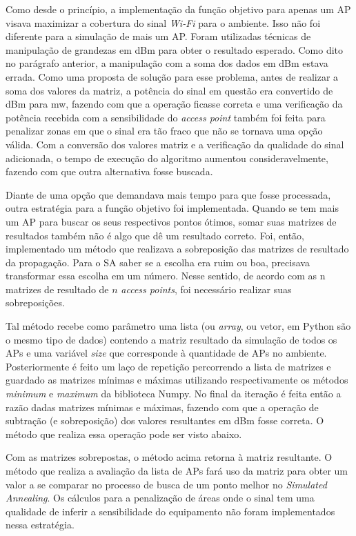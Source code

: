\documentclass[
	12pt,				%
	openright,			%
	twoside,			%
	a4paper,			%
	english,			%
	french,				%
	spanish,			%
	brazil				%
	]{abntex2}
\begin{document}
Como desde o princípio, a implementação da função objetivo para apenas um AP visava maximizar a cobertura do sinal \textit{Wi-Fi} para o ambiente. Isso não foi diferente para a simulação de mais um AP. Foram utilizadas técnicas de manipulação de grandezas em dBm para obter o resultado esperado. Como dito no parágrafo anterior, a manipulação com a soma dos dados em dBm estava errada. Como uma proposta de solução para esse problema, antes de realizar a soma dos valores da matriz, a potência do sinal em questão era convertido de dBm para mw, fazendo com que a operação ficasse correta e uma verificação da potência recebida com a sensibilidade do \textit{access point} também foi feita para penalizar zonas em que o sinal era tão fraco que não se tornava uma opção válida. Com a conversão dos valores matriz e a verificação da qualidade do sinal adicionada, o tempo de execução do algoritmo aumentou consideravelmente, fazendo com que outra alternativa fosse buscada.

Diante de uma opção que demandava mais tempo para que fosse processada, outra estratégia para a função objetivo foi implementada. Quando se tem mais um AP para buscar os seus respectivos pontos ótimos, somar suas matrizes de resultados também não é algo que dê um resultado correto. Foi, então, implementado um método que realizava a sobreposição das matrizes de resultado da propagação. Para o SA saber se a escolha era ruim ou boa, precisava transformar essa escolha em um número. Nesse sentido, de acordo com as n matrizes de resultado de $ \textit{n} $ \textit{access points}, foi necessário realizar suas sobreposições.

Tal método recebe como parâmetro uma lista (ou \textit{array}, ou vetor, em Python são o mesmo tipo de dados) contendo a matriz resultado da simulação de todos os APs e uma variável \textit{size} que corresponde à quantidade de APs no ambiente. Posteriormente é feito um laço de repetição percorrendo a lista de matrizes e guardado as matrizes mínimas e máximas utilizando respectivamente os métodos \textit{minimum} e \textit{maximum} da biblioteca Numpy. No final da iteração é feita então a razão dadas matrizes mínimas e máximas, fazendo com que a operação de subtração (e sobreposição) dos valores resultantes em dBm fosse correta. O método que realiza essa operação pode ser visto abaixo.



Com as matrizes sobrepostas, o método acima retorna à matriz resultante. O método que realiza a avaliação da lista de APs fará uso da matriz para obter um valor a se comparar no processo de busca de um ponto melhor no \textit{Simulated Annealing}. Os cálculos para a penalização de áreas onde o sinal tem uma qualidade de inferir a sensibilidade do equipamento não foram implementados nessa estratégia. 
\end{document}
